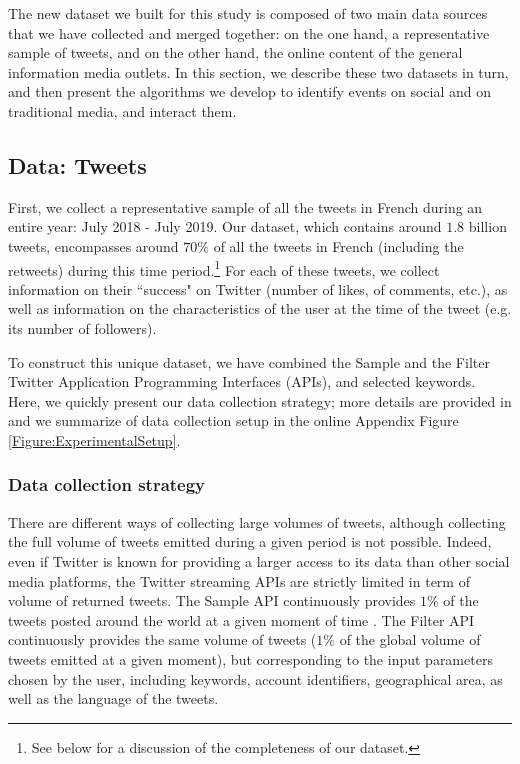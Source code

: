The new dataset we built for this study is composed of two main data sources that we have collected and merged together: on the one hand, a representative sample of tweets, and on the other hand, the online content of the general information media outlets. In this section, we describe these two datasets in turn, and then present the algorithms we develop to identify events on social and on traditional media, and interact them.


\subsection{Data: Tweets\label{Sec:DataTweets}}

First, we collect a representative sample of all the tweets in French during an entire year: July 2018 - July 2019. Our dataset, which contains around $1.8$ billion tweets, encompasses around $70\%$ of all the tweets in French (including the retweets) during this time period.\footnote{See below for a discussion of the completeness of our dataset.} For each of these tweets, we collect information on their ``success" on Twitter (number of likes, of comments, etc.), as well as information on the characteristics of the user at the time of the tweet (e.g. its number of followers).

To construct this unique dataset, we have combined the Sample and the Filter Twitter Application Programming Interfaces (APIs), and selected keywords. Here, we quickly present our data collection strategy; more details are provided in \citet{Mazoyer2018,mazoyer2020french} and we summarize of data collection setup in the online Appendix Figure \ref{Figure:ExperimentalSetup}. 


\subsubsection{Data collection strategy\label{Sec:DataCollectionStrategy}}

There are different ways of collecting large volumes of tweets, although collecting the full volume of tweets emitted during a given period is not possible. Indeed, even if Twitter is known for providing a larger access to its data than other social media platforms, the Twitter streaming APIs are strictly limited in term of volume of returned tweets. The Sample API continuously provides $1\%$ of the tweets posted around the world at a given moment of time \citep[see e.g.][]{kergl_endogenesis_2014,morstatter_when_2014}. The Filter API continuously provides the same volume of tweets ($1\%$ of the global volume of tweets emitted at a given moment), but corresponding to the input parameters chosen by the user, including keywords, account identifiers, geographical area, as well as the language of the tweets.


